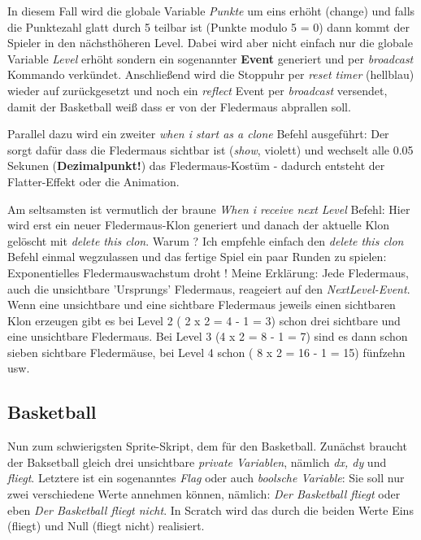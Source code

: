 \documentclass[10pt,a4paper,ngerman,twoside]{article} %
\begin{document}
\begin{multicols}{3}
In diesem Fall wird die globale Variable \textit{Punkte} um eins erhöht (change) und falls die Punktezahl glatt durch 5 teilbar ist (Punkte modulo 5 = 0) dann kommt der Spieler in den nächsthöheren Level. Dabei wird aber nicht einfach nur die globale Variable \textit{Level} erhöht sondern ein sogenannter \textbf{Event} generiert und per \textit{broadcast} Kommando verkündet. Anschließend wird die Stoppuhr per \textit{reset timer} (hellblau) wieder auf zurückgesetzt und noch ein \textit{reflect} Event per \textit{broadcast} versendet, damit der Basketball weiß dass er von der Fledermaus abprallen soll.

Parallel dazu wird ein zweiter \textit{when i start as a clone} Befehl ausgeführt: Der sorgt dafür dass die Fledermaus sichtbar ist (\textit{show}, violett) und wechselt alle 0.05 Sekunen (\textbf{Dezimalpunkt!}) das Fledermaus-Kostüm - dadurch entsteht der Flatter-Effekt oder die Animation.

Am seltsamsten ist vermutlich der braune \textit{When i receive next Level} Befehl: Hier wird erst ein neuer Fledermaus-Klon generiert und danach der aktuelle Klon gelöscht mit \textit{delete this clon}. Warum ? Ich empfehle einfach den \textit{delete this clon} Befehl einmal wegzulassen und das fertige Spiel ein paar Runden zu spielen: Exponentielles Fledermauswachstum droht ! Meine Erklärung: Jede Fledermaus, auch die unsichtbare 'Ursprungs' Fledermaus, reageiert auf den \textit{NextLevel-Event}. Wenn eine unsichtbare und eine sichtbare Fledermaus jeweils einen sichtbaren Klon erzeugen gibt es bei Level 2 ( 2 x 2 = 4 - 1 = 3) schon drei sichtbare und eine unsichtbare Fledermaus. Bei Level 3 (4 x 2 = 8 - 1 = 7) sind es dann schon sieben sichtbare Fledermäuse, bei Level 4 schon ( 8 x 2 = 16 - 1 = 15) fünfzehn usw. 

\subsection*{Basketball}

Nun zum schwierigsten Sprite-Skript, dem für den Basketball. Zunächst braucht der Baksetball gleich drei unsichtbare  \textit{private Variablen}, nämlich \textit{dx, dy} und \textit{fliegt}. Letztere ist ein sogenanntes \textit{Flag} oder auch \textit{boolsche Variable}: Sie soll nur zwei verschiedene Werte annehmen können, nämlich: \textit{Der Basketball fliegt} oder eben  \textit{Der Basketball fliegt nicht}. In Scratch wird das durch die beiden Werte Eins (fliegt) und Null (fliegt nicht) realisiert. 


\end{multicols}
\end{document}
